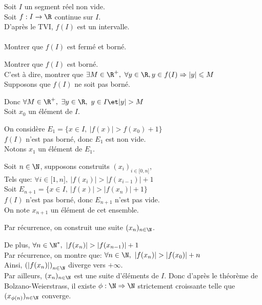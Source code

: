 \documentclass[12pt,twoside,a4paper]{article}
\begin{document}
		\begin{preuve}
			Soit $I$ un segment r\'eel non vide.\\
			Soit $f:I\rightarrow \R$ continue sur $I$.\\
			D'apr\`es le TVI, $f(I)$ est un intervalle.\\
			\\
			Montrer que $f(I)$ est ferm\'e et born\'e.
			\begin{liste}
				\item Montrer que $f(I)$ est born\'e.\\
					C'est \`a dire, montrer que $\exists M\in\R^{+},\ \forall y\in\R, y\in f(I)\Rightarrow |y|\leqslant M$\\
					 Supposons que $f(I)$ ne soit pas born\'e.
					\begin{tab}
						Donc $\forall M\in\R^{+},\ \exists y\in\R,\ y\in I\et |y|> M$\\
						Soit $x_0$ un \'el\'ement de $I$.
						\begin{liste}
							\item On consid\`ere $E_1=\{x\in I,\ |f(x)|>f(x_0)+1 \}$\\
								$f(I)$ n'est pas born\'e, donc $E_1$ est non vide.\\
								Notons $x_1$ un \'el\'ement de $E_1$.
							\item Soit $n\in\N$, supposons construits $(x_i)_{i\in\lbrack0,n\rbrack}$,\\
								Tels que: $\forall i\in\lbrack1,n\rbrack,\ |f(x_i)|>|f(x_{i-1})|+1$\\
								Soit $E_{n+1}=\{x\in I,\ |f(x)|>|f(x_n)|+1 \}$\\
								$f(I)$ n'est pas born\'e, donc $E_{n+1}$ n'est pas vide.\\
								On note $x_{n+1}$ un \'el\'ement de cet ensemble.
							\item Par r\'ecurrence, on construit une suite $(x_n)_{n\in \N}$.
						\end{liste}
						De plus, $\forall n\in\N^{*},\ |f(x_n)|>|f(x_{n-1})|+1$\\
						Par r\'ecurrence, on montre que: $\forall n\in\N,\ |f(x_n)|>|f(x_0)|+n$\\
						Ainsi, $\left( |f(x_n)|\right) _{n\in\N}$ diverge vers $+\infty$.\\
						\newpage
						Par ailleurs, $(x_n)_{n\in\N}$ est une suite d'\'el\'ements de $I$. Donc d'apr\`es le th\'eor\`eme de Bolzano-Weierstrass, il existe $\phi:\N\Rightarrow\N$ strictement croissante telle que $(x_{\phi(n)})_{n\in\N}$ converge.\\

\end{tab}
\end{liste}
\end{preuve}
\end{document}
